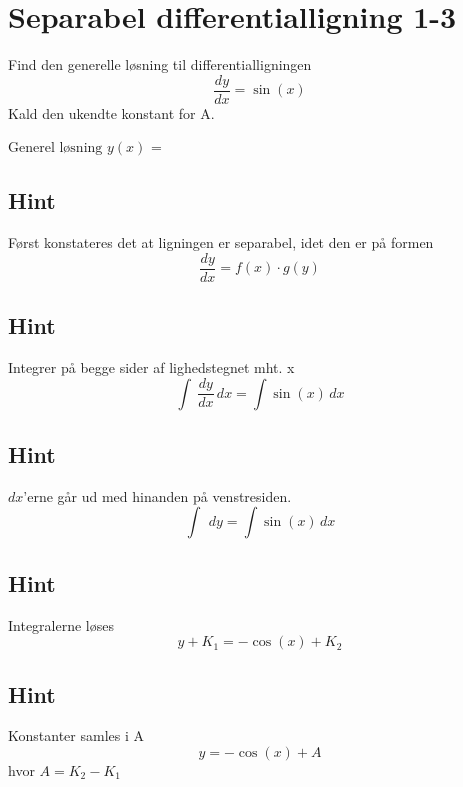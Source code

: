 \documentclass{article}
\newenvironment{exercise}[1]{\newpage\section{#1}}{}
\newcommand{\answerbox}[1]{\fbox{$#1$}}
\newcommand{\hint}{\subsection*{Hint}}
\begin{document}
\begin{exercise}{Separabel differentialligning 1-3}


	Find den generelle løsning til differentialligningen 
	\[
	\frac{dy}{dx} = \sin(x)
	\]
	Kald den ukendte konstant for A.
	
	$\textrm{Generel løsning } y(x)$ = \answerbox{- \cos(x) + A}
	
	\hint
	
	Først konstateres det at ligningen er separabel, idet den er på formen
	\[
	\frac{dy}{dx} = f(x) \cdot g(y)
	\]
	
	\hint
	
	Integrer på begge sider af lighedstegnet mht. x
	\[
	\int\ \frac{dy}{dx}\, dx= \int \sin (x)\,dx
	\]
	
	\hint
	
	$dx$'erne går ud med hinanden på venstresiden.
	\[
	\int\ \, dy= \int \sin(x)\,dx
	\]
	
	\hint
	
	Integralerne løses
	\[
	y + K_1 =- \cos (x) + K_2
	\]
	
	
	\hint
	
	Konstanter samles i A
	\[
	y = - \cos(x) + A
	\]
	hvor $A=K_2-K_1$
	
\end{exercise}


\newpage
\end{document}
